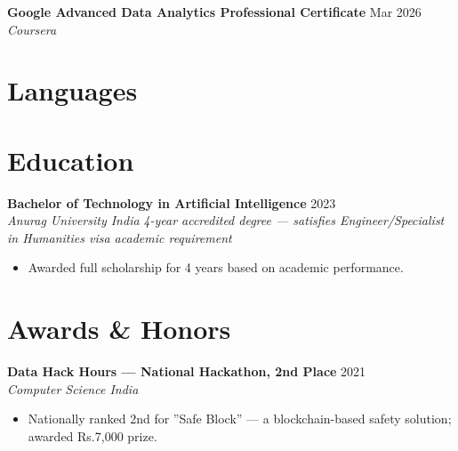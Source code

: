 \documentclass[10pt,letterpaper]{article}
\newcommand{\entry}[3]{%
  \vspace{3pt}\textbf{#1} \hfill #3 \\
  \textit{\small #2}\vspace{1pt}}
\begin{document}
\textbf{Google Advanced Data Analytics Professional Certificate} \hfill Mar 2026 \\
\textit{Coursera}

\section{Languages}


\section{Education}

\entry{Bachelor of Technology in Artificial Intelligence}{Anurag University \textbullet{} India}{2023}
\newline\textit{\small 4-year accredited degree --- satisfies Engineer/Specialist in Humanities visa academic requirement}
\begin{itemize}
  \item Awarded full scholarship for 4 years based on academic performance.
\end{itemize}

\section{Awards \& Honors}

\textbf{Data Hack Hours --- National Hackathon, 2nd Place} \hfill 2021 \\
\textit{Computer Science India}
\begin{itemize}
  \item Nationally ranked 2nd for ''Safe Block'' --- a blockchain-based safety solution; awarded Rs.7,000 prize.
\end{itemize}
\end{document}
